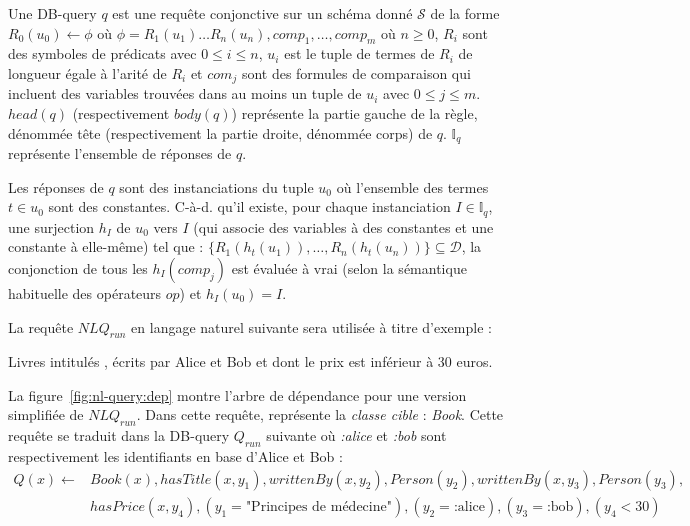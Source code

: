 \begin{definition}[DB-query]
    Une DB-query $q$ est une requête conjonctive sur un schéma donné $\mathcal{S}$ de la forme $R_0(u_0) \leftarrow \phi$ où $\phi = R_1(u_1) \dots  R_n(u_n), comp_1, \dots, comp_m$ où $n \geq 0$, $R_i$ sont des symboles de prédicats avec $0 \leq i \leq n$, $u_i$ est le tuple de termes de $R_i$ de longueur égale à l'arité de $R_i$ et $com_j$ sont des formules de comparaison qui incluent des variables trouvées dans au moins un tuple de $u_i$ avec $0 \leq j \leq m$.
    $head(q)$ (respectivement $body(q)$) représente la partie gauche de la règle, dénommée tête (respectivement la partie droite, dénommée corps) de $q$.
    $\mathbb{I}_q$ représente l'ensemble de réponses de $q$.

    Les réponses de $q$ sont des instanciations du tuple $u_0$ où l'ensemble des termes $t \in u_0$ sont des constantes.
    C-à-d. qu'il existe, pour chaque instanciation $I \in \mathbb{I}_q$, une surjection $h_I$ de $u_0$ vers $I$ (qui associe des variables à des constantes et une constante à elle-même) tel que : $\{R_1(h_t(u_1)), \dots, R_n(h_t(u_n))\} \subseteq \mathcal{D}$, la conjonction de tous les $h_I(comp_j)$ est évaluée à vrai (selon la sémantique habituelle des opérateurs $op$) et $h_I(u_0)= I$.

\end{definition}

\begin{example}
    La requête $NLQ_{run}$ en langage naturel suivante sera utilisée à titre d'exemple :
    \begin{displayquote}
        Livres intitulés , écrits par Alice et Bob et dont le prix est inférieur à 30 euros.
    \end{displayquote}

    La figure~\ref{fig:nl-query:dep} montre l'arbre de dépendance pour une version simplifiée de $NLQ_{run}$.
    Dans cette requête,  représente la \emph{classe cible} : \emph{Book}.
    Cette requête se traduit dans la DB-query $Q_{run}$ suivante où \emph{:alice} et \emph{:bob} sont respectivement les identifiants en base d'Alice et Bob :
    \begin{equation*}
        \begin{split}
            Q(x) \leftarrow & Book(x), hasTitle(x, y_1), writtenBy(x, y_2), Person(y_2), writtenBy(x, y_3), Person(y_3),                      \\
                            & hasPrice(x, y_4), (y_1 = \text{"Principes de médecine"}), (y_2= \text{:alice}), (y_3 = \text{:bob}), (y_4 < 30)
        \end{split}
    \end{equation*}
\end{example}

